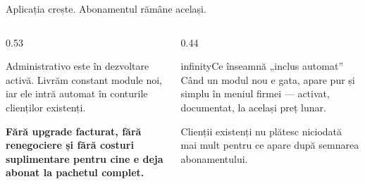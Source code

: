 \documentclass[aspectratio=169,11pt,t,xcolor={table}]{beamer}
\begin{document}
\begin{frame}{Aplicația crește. Abonamentul rămâne același.}
  \begin{columns}[T,onlytextwidth]
    \begin{column}{0.53\textwidth}
      {\footnotesize
      Administrativo este în dezvoltare activă. Livrăm constant module noi, iar ele
      intră automat în conturile clienților existenți.
      \par\vspace{5pt}
      \textbf{Fără upgrade facturat, fără renegociere și fără costuri suplimentare
      pentru cine e deja abonat la pachetul complet.}}
      \vspace{7pt}
      \begin{beneficii}
        \footnotesize
        \par\vspace{2pt}
        \par\vspace{2pt}
      \end{beneficii}
    \end{column}
    \begin{column}{0.44\textwidth}
      \begin{card}[brandTeal]{infinity}{Ce înseamnă „inclus automat”}
        \footnotesize
        Când un modul nou e gata, apare pur și simplu în meniul firmei —
        activat, documentat, la același preț lunar.
      \end{card}
      \vspace{5pt}
      \begin{nota}
        \footnotesize Clienții existenți nu plătesc niciodată mai mult pentru ce
        apare după semnarea abonamentului.
      \end{nota}
    \end{column}
  \end{columns}
\end{frame}
\end{document}
